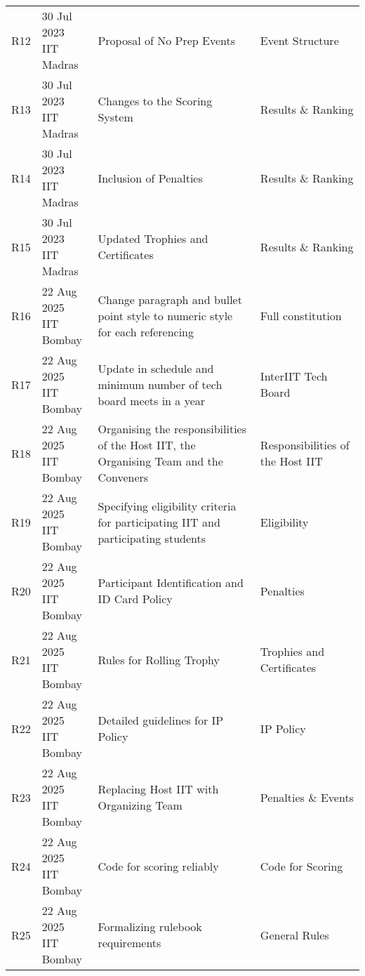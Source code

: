 \begin{center}
\begin{longtable}{c m{3.2cm} m{6.2cm} m{3.5cm}}
R12 & \makecell[l]{30 Jul 2023\\ IIT Madras} & Proposal of No Prep Events & Event Structure \\
R13 & \makecell[l]{30 Jul 2023\\ IIT Madras} & Changes to the Scoring System & Results \& Ranking \\
R14 & \makecell[l]{30 Jul 2023\\ IIT Madras} & Inclusion of Penalties & Results \& Ranking \\
R15 & \makecell[l]{30 Jul 2023\\ IIT Madras} & Updated Trophies and Certificates & Results \& Ranking \\
R16 & \makecell[l]{22 Aug 2025\\ IIT Bombay} & Change paragraph and bullet point style to numeric style for each referencing & Full constitution \\
R17 & \makecell[l]{22 Aug 2025\\ IIT Bombay} & Update in schedule and minimum number of tech board meets in a year &  InterIIT Tech Board  \\
R18 & \makecell[l]{22 Aug 2025\\ IIT Bombay} & Organising the responsibilities of the Host IIT, the Organising Team and the Conveners & Responsibilities of the Host IIT \\
R19 & \makecell[l]{22 Aug 2025\\ IIT Bombay} & Specifying eligibility criteria for participating IIT and participating students & Eligibility \\
R20 & \makecell[l]{22 Aug 2025\\ IIT Bombay} & Participant Identification and ID Card Policy & Penalties \\
R21 & \makecell[l]{22 Aug 2025\\ IIT Bombay} & Rules for Rolling Trophy & Trophies and Certificates \\
R22 & \makecell[l]{22 Aug 2025\\ IIT Bombay} & Detailed guidelines for IP Policy & IP Policy \\
R23 & \makecell[l]{22 Aug 2025\\ IIT Bombay} & Replacing Host IIT with Organizing Team & Penalties \& Events \\
R24 & \makecell[l]{22 Aug 2025\\ IIT Bombay} & Code for scoring reliably
 & Code for Scoring \\
R25 & \makecell[l]{22 Aug 2025\\ IIT Bombay} & Formalizing rulebook requirements & General Rules \\

\end{longtable}
\end{center}
